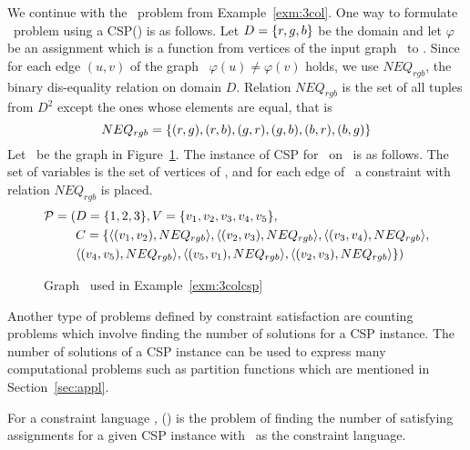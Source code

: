 \begin{example}[\tcoloring]\label{exm:3colcsp}
We continue with the \tcoloring\ problem from Example~\ref{exm:3col}.
One way to formulate \tcoloring\ problem using a CSP(\mrelset) is as follows.
Let  \(D=\{{r,g,b}\}\) be the domain and
let \(\varphi\) be an assignment which is a function from vertices of the input graph \mG\ to \mD\@.
Since for each edge \((u,v)\) of the graph \mG\ \(\varphi(u)\neq\varphi(v)\) holds,
we use \(NEQ_{rgb}\), the binary dis-equality relation on domain \(D\)\@. Relation \(NEQ_{rgb}\) is the set of all tuples from 
\(D^2\) except the ones whose elements are equal, that is
\[NEQ_{rgb}=\{{(r,g),(r,b),(g,r),(g,b),(b,r), (b,g)}\}\]
Let \mG\ be the graph in Figure~\ref{fig:sample}. The instance of 
CSP for \tcoloring\ on \mG\ is as follows. The set of variables is the set of vertices of \mG,
and for each edge of \mG\ a constraint with relation \(NEQ_{rgb}\) is placed.
\begin{align*}
\mathcal{P}=(&D=\{{1,2,3}\},V=\{{v_1,v_2,v_3,v_4,v_5}\}, \\
&C=\{\langle (v_1,v_2),NEQ_{rgb} \rangle, \langle (v_2,v_3),NEQ_{rgb} \rangle,\langle (v_3,v_4),NEQ_{rgb} \rangle,\\
&\langle (v_4,v_5),NEQ_{rgb} \rangle, \langle (v_5,v_1),NEQ_{rgb} \rangle,
\langle (v_2,v_3),NEQ_{rgb} \rangle\})
\end{align*}
\end{example}
\begin{figure}
\centering

\caption{Graph \mG\ used in Example~\ref{exm:3colcsp}}\label{fig:sample}
\end{figure}


Another type of problems defined by constraint satisfaction are
counting problems which involve finding the number of solutions for a CSP instance.
The number of solutions of a CSP instance can be used to express many computational problems
such as partition functions which are mentioned in Section~\ref{sec:appl}.

\begin{defi}[\ccsp(\mrelset)] 
For a constraint language \mrelset,
\ccsp(\mrelset) is the problem of finding the number of satisfying assignments for a
given CSP instance with \mrelset\ as the constraint language.
\end{defi}

